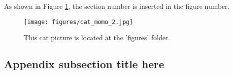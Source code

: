\documentclass[12pt,a4paper]{article}
\begin{document}
\begin{appendices}
As shown in Figure \ref{fig:cat2}, the section number is inserted in the figure number.
\lipsum[13]

\begin{figure}[!htbp]
\centering
\texttt{[image: figures/cat\_momo\_2.jpg]}
\caption{\label{fig:cat2}This cat picture is located at the 'figures' folder.}
\end{figure}

\lipsum[14]

\subsection{Appendix subsection title here}
\lipsum[15]

\end{appendices}
\end{document}
